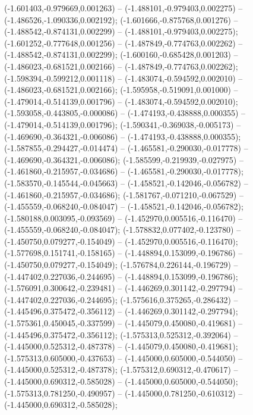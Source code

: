  (-1.601403,-0.979669,0.001263) -- (-1.488101,-0.979403,0.002275) -- (-1.486526,-1.090336,0.002192);
 (-1.601666,-0.875768,0.001276) -- (-1.488542,-0.874131,0.002299) -- (-1.488101,-0.979403,0.002275);
 (-1.601252,-0.777648,0.001256) -- (-1.487849,-0.774763,0.002262) -- (-1.488542,-0.874131,0.002299);
 (-1.600160,-0.685428,0.001203) -- (-1.486023,-0.681521,0.002166) -- (-1.487849,-0.774763,0.002262);
 (-1.598394,-0.599212,0.001118) -- (-1.483074,-0.594592,0.002010) -- (-1.486023,-0.681521,0.002166);
 (-1.595958,-0.519091,0.001000) -- (-1.479014,-0.514139,0.001796) -- (-1.483074,-0.594592,0.002010);
 (-1.593058,-0.443805,-0.000086) -- (-1.474193,-0.438888,0.000355) -- (-1.479014,-0.514139,0.001796);
 (-1.590341,-0.369038,-0.005173) -- (-1.469690,-0.364321,-0.006086) -- (-1.474193,-0.438888,0.000355);
 (-1.587855,-0.294427,-0.014474) -- (-1.465581,-0.290030,-0.017778) -- (-1.469690,-0.364321,-0.006086);
 (-1.585599,-0.219939,-0.027975) -- (-1.461860,-0.215957,-0.034686) -- (-1.465581,-0.290030,-0.017778);
 (-1.583570,-0.145544,-0.045663) -- (-1.458521,-0.142046,-0.056782) -- (-1.461860,-0.215957,-0.034686);
 (-1.581767,-0.071210,-0.067529) -- (-1.455559,-0.068240,-0.084047) -- (-1.458521,-0.142046,-0.056782);
 (-1.580188,0.003095,-0.093569) -- (-1.452970,0.005516,-0.116470) -- (-1.455559,-0.068240,-0.084047);
 (-1.578832,0.077402,-0.123780) -- (-1.450750,0.079277,-0.154049) -- (-1.452970,0.005516,-0.116470);
 (-1.577698,0.151741,-0.158165) -- (-1.448894,0.153099,-0.196786) -- (-1.450750,0.079277,-0.154049);
 (-1.576784,0.226144,-0.196729) -- (-1.447402,0.227036,-0.244695) -- (-1.448894,0.153099,-0.196786);
 (-1.576091,0.300642,-0.239481) -- (-1.446269,0.301142,-0.297794) -- (-1.447402,0.227036,-0.244695);
 (-1.575616,0.375265,-0.286432) -- (-1.445496,0.375472,-0.356112) -- (-1.446269,0.301142,-0.297794);
 (-1.575361,0.450045,-0.337599) -- (-1.445079,0.450080,-0.419681) -- (-1.445496,0.375472,-0.356112);
 (-1.575313,0.525312,-0.392064) -- (-1.445000,0.525312,-0.487378) -- (-1.445079,0.450080,-0.419681);
 (-1.575313,0.605000,-0.437653) -- (-1.445000,0.605000,-0.544050) -- (-1.445000,0.525312,-0.487378);
 (-1.575312,0.690312,-0.470617) -- (-1.445000,0.690312,-0.585028) -- (-1.445000,0.605000,-0.544050);
 (-1.575313,0.781250,-0.490957) -- (-1.445000,0.781250,-0.610312) -- (-1.445000,0.690312,-0.585028);
